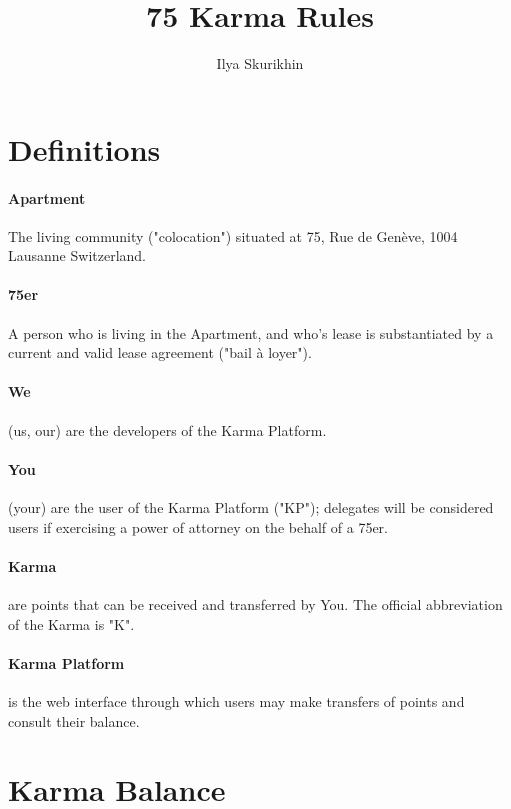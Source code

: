 \documentclass[12pt,a4paper]{article}
\author{Ilya Skurikhin}
\title{75 Karma Rules}
\begin{document}
\section{Definitions}

\paragraph{Apartment}

The living community ("colocation") situated at 75, Rue de Genève, 1004 Lausanne Switzerland.

\paragraph{75er}

A person who is living in the Apartment, and who's lease is substantiated by a current and valid lease agreement ("bail à loyer").

\paragraph{We}

(us, our) are the developers of the Karma Platform. 

\paragraph{You}

(your) are the user of the Karma Platform ("KP"); delegates will be considered users if exercising a power of attorney on the behalf of a 75er.
	
\paragraph{Karma}

are points that can be received and transferred by You. The official abbreviation of the Karma is "K".

\paragraph{Karma Platform}

is the web interface through which users may make transfers of points and consult their balance. 

\section{Karma Balance}
\end{document}
